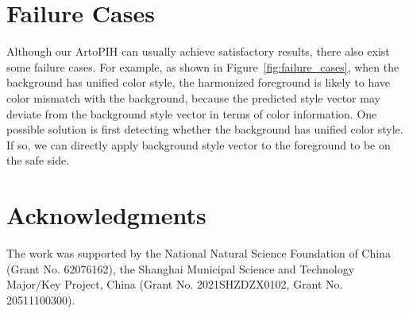 \documentclass[letterpaper]{article} %
\begin{document}
\section{Failure Cases} \label{sec:failure_case}

Although our ArtoPIH can usually achieve satisfactory results, there also exist some failure cases. For example, as shown in Figure~\ref{fig:failure_cases}, when the background has unified color style, the harmonized foreground is likely to have color mismatch with the background, because the predicted style vector may deviate from the background style vector in terms of color information. One possible solution is first detecting whether the background has unified color style. If so, we can directly apply background style vector to the foreground to be on the safe side. 










\section*{Acknowledgments}
The work was supported by the National Natural Science Foundation of China (Grant No. 62076162), the Shanghai Municipal Science and Technology Major/Key Project, China (Grant No. 2021SHZDZX0102, Grant No. 20511100300).  



\end{document}
